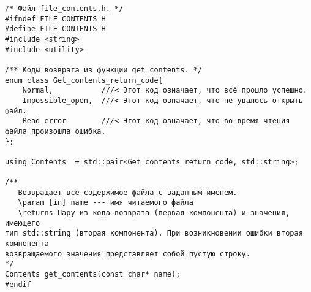 \documentclass[10pt]{report}
\newcounter{defin}[section]
\begin{document}
\begin{verbatim}
/* Файл file_contents.h. */
#ifndef FILE_CONTENTS_H
#define FILE_CONTENTS_H
#include <string>
#include <utility>

/** Коды возврата из функции get_contents. */
enum class Get_contents_return_code{
    Normal,           ///< Этот код означает, что всё прошло успешно.
    Impossible_open,  ///< Этот код означает, что не удалось открыть файл.
    Read_error        ///< Этот код означает, что во время чтения файла произошла ошибка.
};

using Contents  = std::pair<Get_contents_return_code, std::string>;

/**
   Возвращает всё содержимое файла с заданным именем.
   \param [in] name --- имя читаемого файла
   \returns Пару из кода возврата (первая компонента) и значения, имеющего
тип std::string (вторая компонента). При возникновении ошибки вторая компонента
возвращаемого значения представляет собой пустую строку.
*/
Contents get_contents(const char* name);
#endif
\end{verbatim}
\end{document}
